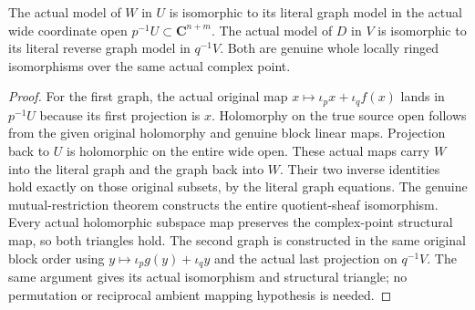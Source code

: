 \begin{theorem}
\label{hir:actual-local-common-graph-wide-model-isos}
\leanok
The actual model of $W$ in $U$ is isomorphic to its literal graph model
in the actual wide coordinate open $p^{-1}U\subset\mathbf C^{n+m}$.
The actual model of $D$ in $V$ is isomorphic to its literal reverse graph
model in $q^{-1}V$. Both are genuine whole locally ringed isomorphisms
over the same actual complex point.
\end{theorem}
\begin{proof}
For the first graph, the actual original map
$x\mapsto\iota_p x+\iota_q f(x)$ lands in $p^{-1}U$ because its first
projection is $x$. Holomorphy on the true source open follows from the
given original holomorphy and genuine block linear maps. Projection back
to $U$ is holomorphic on the entire wide open. These actual maps carry
$W$ into the literal graph and the graph back into $W$. Their two
inverse identities hold exactly on those original subsets, by the
literal graph equations. The genuine mutual-restriction theorem
constructs the entire quotient-sheaf isomorphism. Every actual holomorphic
subspace map preserves the complex-point structural map, so both
triangles hold. The second graph is constructed in the same original
block order using $y\mapsto\iota_p g(y)+\iota_q y$ and the actual last
projection on $q^{-1}V$. The same argument gives its actual isomorphism
and structural triangle; no permutation or reciprocal ambient mapping
hypothesis is needed.
\end{proof}


